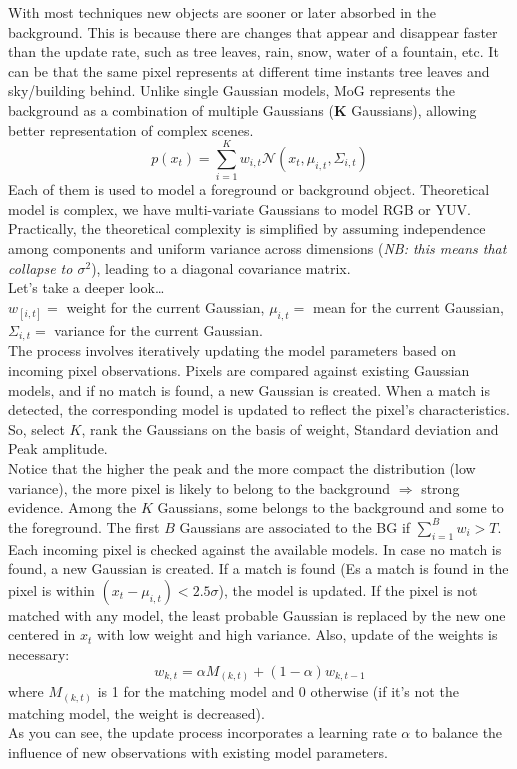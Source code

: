 With most techniques new objects are sooner or later absorbed in the background. This is because there are changes that appear and disappear faster than the update rate, such as tree leaves, rain, snow, water of a fountain, etc.
It can be that the same pixel represents at different time instants tree leaves and sky/building behind.
Unlike single Gaussian models, MoG represents the background as a combination of multiple Gaussians (\textbf{K} Gaussians), allowing better representation of complex scenes. 
\[
    p(x_t) = \sum_{i=1}^{K} w_{i,t} \mathcal{N}(x_t, \mu_{i,t}, \Sigma_{i,t})
\]
Each of them is used to model a foreground or background object. Theoretical model is complex, we have multi-variate Gaussians to model RGB or YUV. 
\\
Practically, the theoretical complexity is simplified by assuming independence among components and uniform variance across dimensions (\textit{NB: this means that collapse to $\sigma^2$}), leading to a diagonal covariance matrix. 
\\Let's take a deeper look\dots\\
$w_{[i,t]} = $ weight for the current Gaussian, $\mu_{i,t} = $ mean for the current Gaussian, $\Sigma_{i,t} = $ variance for the current Gaussian.
\\
The process involves iteratively updating the model parameters based on incoming pixel observations. 
Pixels are compared against existing Gaussian models, and if no match is found, a new Gaussian is created. 
When a match is detected, the corresponding model is updated to reflect the pixel's characteristics.
\\
So, select $K$, rank the Gaussians on the basis of weight, Standard deviation and Peak amplitude.
\\
Notice that the higher the peak and the more compact the distribution (low variance), the more pixel is likely to belong to the background $\Rightarrow$ strong evidence.
Among the $K$ Gaussians, some belongs to the background and some to the foreground. The first $B$ Gaussians are associated to the BG if $\sum_{i=1}^B w_i > T$.
Each incoming pixel is checked against the available models. In case no match is found, a new Gaussian is created. 
If a match is found (Es a match is found in the pixel is within $(x_t - \mu_{i, t})<2.5\sigma$), the model is updated. 
If the pixel is not matched with any model, the least probable Gaussian is replaced by the new one centered in $x_t$ with low weight and high variance.  
Also, update of the weights is necessary: 
\[
    w_{k,t} = \alpha M_(k,t) + (1-\alpha)w_{k,t-1}
\] 
where $M_(k,t)$ is 1 for the matching model and 0 otherwise (if it's not the matching model, the weight is decreased). 
\\
As you can see, the update process incorporates a learning rate $\alpha$ to balance the influence of new observations with existing model parameters.
